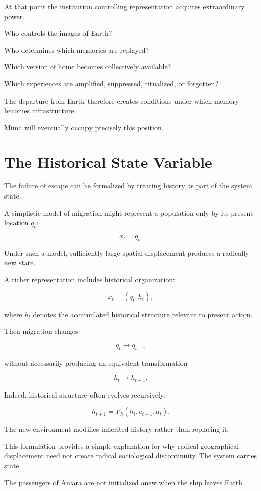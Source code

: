 \documentclass[11pt,oneside]{book}
\theoremstyle{definition}
\theoremstyle{remark}
\begin{document}
At that point the institution controlling representation acquires extraordinary power.

Who controls the images of Earth?

Who determines which memories are replayed?

Which version of home becomes collectively available?

Which experiences are amplified, suppressed, ritualized, or forgotten?

The departure from Earth therefore creates conditions under which memory becomes infrastructure.

Mima will eventually occupy precisely this position.

\section{The Historical State Variable}

The failure of escape can be formalized by treating history as part of the system state.

A simplistic model of migration might represent a population only by its present location \(q_t\):

\[
x_t=q_t.
\]

Under such a model, sufficiently large spatial displacement produces a radically new state.

A richer representation includes historical organization:

\[
x_t
=
(q_t,h_t),
\]

where \(h_t\) denotes the accumulated historical structure relevant to present action.

Then migration changes

\[
q_t\rightarrow q_{t+1}
\]

without necessarily producing an equivalent transformation

\[
h_t\rightarrow h_{t+1}.
\]

Indeed, historical structure often evolves recursively:

\[
h_{t+1}
=
F_h(h_t,e_{t+1},a_t).
\]

The new environment modifies inherited history rather than replacing it.

This formulation provides a simple explanation for why radical geographical displacement need not create radical sociological discontinuity. The system carries state.

The passengers of Aniara are not initialized anew when the ship leaves Earth.
\end{document}
